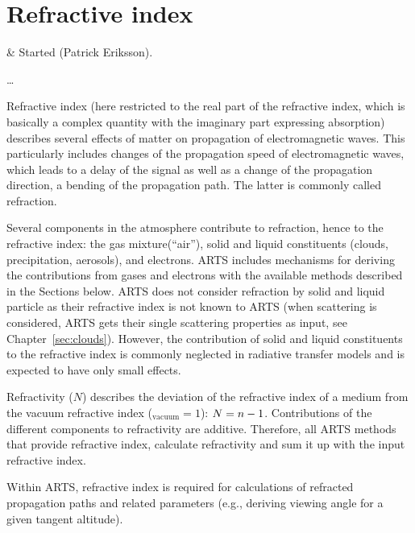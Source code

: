 \chapter{Refractive index}
 \label{sec:rindex}

 & Started (Patrick Eriksson).\\
\stophistory

 \dots

Refractive index (here restricted to the real part of the refractive index, which is basically a complex quantity with the imaginary part expressing absorption) describes several effects of matter on propagation of electromagnetic waves. This particularly includes changes of the propagation speed of electromagnetic waves, which leads to a delay of the signal as well as a change of the propagation direction, a bending of the propagation path. The latter is commonly called refraction.

Several components in the atmosphere contribute to refraction, hence to the
refractive index: the gas mixture(``air''), solid and liquid constituents
(clouds, precipitation, aerosols), and electrons. ARTS includes mechanisms for
deriving the contributions from gases and electrons with the available methods
described in the Sections below. ARTS does not consider
refraction by solid and liquid particle as their refractive index is not known
to ARTS (when scattering is considered, ARTS gets their single scattering
properties as input, see Chapter~\ref{sec:clouds}). However, the contribution of
solid and liquid constituents to the refractive index is commonly neglected in
radiative transfer models and is expected to have only small effects.

Refractivity ($N$) describes the deviation of the refractive index of a medium \Rfr  from the vacuum refractive index (\Rfr$_\mathrm{vacuum}=1$): $N=n-1$. Contributions of the different components to refractivity are additive. Therefore, all ARTS methods that provide refractive index, calculate refractivity and sum it up with the input refractive index.

Within ARTS, refractive index is required for calculations of refracted propagation paths and related parameters (e.g., deriving viewing angle for a given tangent altitude). 



